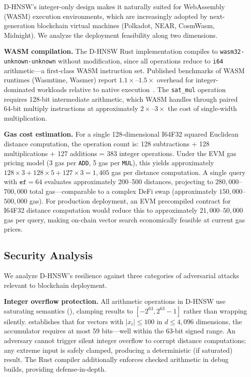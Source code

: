 \documentclass[10pt,journal]{IEEEtran}
\newcommand{\dhnsw}{\textsc{D-HNSW}}
\begin{document}
\dhnsw{}'s integer-only design makes it naturally suited for WebAssembly (WASM) execution environments, which are increasingly adopted by next-generation blockchain virtual machines (Polkadot, NEAR, CosmWasm, Midnight). We analyze the deployment feasibility along two dimensions.

\textbf{WASM compilation.} The \dhnsw{} Rust implementation compiles to \texttt{wasm32-unknown-unknown} without modification, since all operations reduce to \texttt{i64} arithmetic---a first-class WASM instruction set. Published benchmarks of WASM runtimes (Wasmtime, Wasmer) report $1.1\times$--$1.5\times$ overhead for integer-dominated workloads relative to native execution~\cite{haas2017wasm}. The \texttt{sat\_mul} operation requires 128-bit intermediate arithmetic, which WASM handles through paired 64-bit multiply instructions at approximately $2\times$--$3\times$ the cost of single-width multiplication.

\textbf{Gas cost estimation.} For a single 128-dimensional I64F32 squared Euclidean distance computation, the operation count is: 128 subtractions + 128 multiplications + 127 additions = 383 integer operations. Under the EVM gas pricing model (3 gas per \texttt{ADD}, 5 gas per \texttt{MUL}), this yields approximately $128 \times 3 + 128 \times 5 + 127 \times 3 = 1{,}405$ gas per distance computation. A single query with $\texttt{ef}=64$ evaluates approximately 200--500 distances, projecting to $280{,}000$--$700{,}000$ total gas---comparable to a complex DeFi swap (approximately $150{,}000$--$500{,}000$ gas). For production deployment, an EVM precompiled contract for I64F32 distance computation would reduce this to approximately $21{,}000$--$50{,}000$ gas per query, making on-chain vector search economically feasible at current gas prices.

\subsection{Security Analysis}
\label{sec:security_analysis}

We analyze \dhnsw{}'s resilience against three categories of adversarial attacks relevant to blockchain deployment.

\textbf{Integer overflow protection.} All arithmetic operations in \dhnsw{} use saturating semantics (), clamping results to $[-2^{63}, 2^{63}-1]$ rather than wrapping silently.  establishes that for vectors with $|x_i| \leq 100$ in $d \leq 4{,}096$ dimensions, the accumulator requires at most 59 bits---well within the 63-bit signed range. An adversary cannot trigger silent integer overflow to corrupt distance computations; any extreme input is safely clamped, producing a deterministic (if saturated) result. The Rust compiler additionally enforces checked arithmetic in debug builds, providing defense-in-depth.
\end{document}
